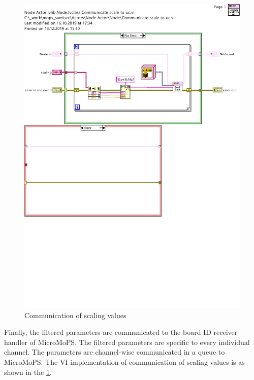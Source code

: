 \begin{figure}[hbt]
		\centering
		\includegraphics[trim=0 510 0 75, clip, width=130mm, scale=1]{images/commscaling.pdf}
		\caption{Communication of scaling values}
		\label{fig:COS}
\end{figure}


Finally, the filtered parameters are communicated to the board ID receiver handler of MicroMoPS. 
The filtered parameters are specific to every individual channel. 
The parameters are channel-wise communicated in a queue to MicroMoPS.
The \acrshort{VI} implementation of communication of scaling values is as shown in the \cref{fig:COS}.   

